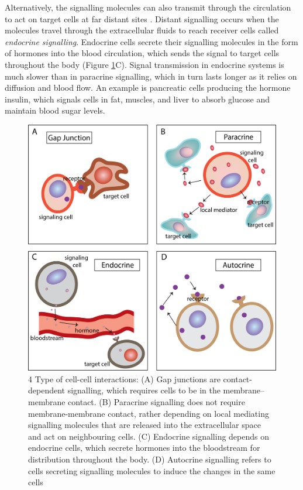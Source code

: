 Alternatively, the signalling molecules can also transmit through the circulation to act on target cells at far distant sites \cite{cooper2004cell, alberts2018molecular}. Distant signalling occurs when the molecules travel through the extracellular fluids to reach receiver cells called \textit{endocrine signalling}. Endocrine cells secrete their signalling molecules in the form of hormones into the blood circulation, which sends the signal to target cells throughout the body (Figure \ref{fig:Chap1_figure2}C). Signal transmission in endocrine systems is much slower than in paracrine signalling, which in turn lasts longer as it relies on diffusion and blood flow. An example is pancreatic cells producing the hormone insulin, which signals cells in fat, muscles, and liver to absorb glucose and maintain blood sugar levels.

\begin{figure}[htp]
    \centering
    \includegraphics[width=0.8\columnwidth]{Chapter1/Figures/Chap1_figure2.png}
    \caption[4 Type of cell-cell interactions]{4 Type of cell-cell interactions: (A) Gap junctions are contact-dependent signalling, which requires cells to be in the membrane–membrane contact. (B) Paracrine signalling does not require membrane-membrane contact, rather depending on local mediating signalling molecules that are released into the extracellular space and act on neighbouring cells. (C) Endocrine signalling depends on endocrine cells, which secrete hormones into the bloodstream for distribution throughout the body. (D) Autocrine signalling refers to cells secreting signalling molecules to induce the changes in the same cells}
    \label{fig:Chap1_figure2}
\end{figure}

